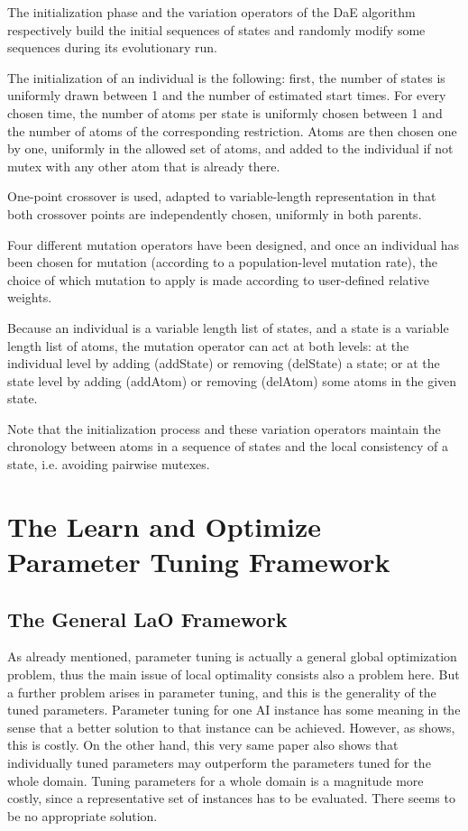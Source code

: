 \documentclass{acm_proc_article-sp}
\begin{document}
The initialization phase and the variation operators of the DaE algorithm respectively build the initial sequences of states and randomly modify some sequences during its evolutionary run.

The initialization of an individual is the following: first, the number of states is uniformly drawn between 1 and the number of estimated start times.  For every chosen time, the number of atoms per state is uniformly chosen between 1 and the number of atoms of the corresponding restriction. Atoms are then chosen one by one, uniformly in the allowed set of atoms, and added to the individual if not mutex with any other atom that is already there.

One-point crossover is used, adapted to variable-length representation in that both crossover points are independently chosen, uniformly in both parents.

Four different mutation operators have been designed, and once an individual has been chosen for mutation (according to a population-level mutation rate), the choice of which mutation to apply is made according to user-defined relative weights. 

Because an individual is a variable length list of states, and a state is a variable length list of atoms, the mutation 
operator can act at both levels: at the individual level by adding (addState) or removing (delState) 
a state; or at the state level by adding (addAtom) or removing (delAtom) some atoms in the given state. 

Note that the initialization process and these variation operators maintain the chronology between atoms in a sequence of states and the local consistency of a state, i.e. avoiding pairwise mutexes.

\section{The Learn and Optimize Parameter Tuning Framework}
\label{section:LaO}

\subsection{The General LaO Framework}

As already mentioned, parameter tuning is actually a general global optimization problem, thus the main issue of local optimality consists also a problem here. But a further problem arises in parameter tuning, and this is the generality of the tuned parameters. Parameter tuning for one AI instance has some meaning in the sense that a better solution to that instance can be achieved. However, as \cite{BibGECCO:2010} shows, this is costly. On the other hand, this very same paper also shows that individually tuned parameters may outperform the parameters tuned for the whole domain. Tuning parameters for a whole domain is a magnitude more costly, since a representative set of instances has to be evaluated. There seems to be no appropriate solution.
\end{document}
